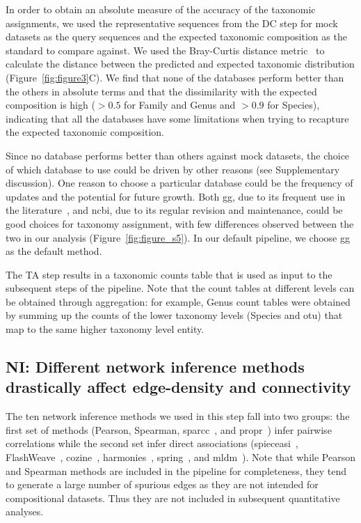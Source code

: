   In order to obtain an absolute measure of the accuracy of the taxonomic assignments, we used the representative sequences from the DC step for mock datasets as the query sequences and the expected taxonomic composition as the standard to compare against.
  We used the Bray-Curtis distance metric~\cite{virtanenSciPyFundamentalAlgorithms2020} to calculate the distance between the predicted and expected taxonomic distribution (Figure~\ref{fig:figure3}C).
  We find that none of the databases perform better than the others in absolute terms and that the dissimilarity with the expected composition is high ($>0.5$ for Family and Genus and $>0.9$ for Species), indicating that all the databases have some limitations when trying to recapture the expected taxonomic composition.

  Since no database performs better than others against mock datasets, the choice of which database to use could be driven by other reasons (see Supplementary discussion).
  One reason to choose a particular database could be the frequency of updates and the potential for future growth.
  Both \ac{gg}, due to its frequent use in the literature~\cite{Balvociute2017}, and \ac{ncbi}, due to its regular revision and maintenance, could be good choices for taxonomy assignment, with few differences observed between the two in our analysis  (Figure~\ref{fig:figure_s5}).
  In our default pipeline, we choose \ac{gg} as the default method.

  The TA step results in a taxonomic counts table that is used as input to the subsequent steps of the pipeline.
  Note that the count tables at different levels can be obtained through aggregation: for example, Genus count tables were obtained by summing up the counts of the lower taxonomy levels (Species and \ac{otu}) that map to the same higher taxonomy level entity.

  \FloatBarrier

  \subsection*{NI: Different network inference methods drastically affect edge-density and connectivity}

   The ten network inference methods we used in this step fall into two groups: the first set of methods (Pearson, Spearman, \acs{sparcc}~\cite{Friedman2012,Watts2018}, and propr~\cite{quinnProprRpackageIdentifying2017}) infer pairwise correlations while the second set infer direct associations (\acs{spieceasi}~\cite{Kurtz2015}, FlashWeave~\cite{tackmannRapidInferenceDirect2019}, \acs{cozine}~\cite{haCompositionalZeroinflatedNetwork2020a}, \acs{harmonies}~\cite{jiangHARMONIESHybridApproach2020}, \acs{spring}~\cite{yoonMicrobialNetworksSPRING2019}, and \acs{mldm}~\cite{Yang2017}).
   Note that while Pearson and Spearman methods are included in the pipeline for completeness, they tend to generate a large number of spurious edges as they are not intended for compositional datasets.
   Thus they are not included in subsequent quantitative analyses.

